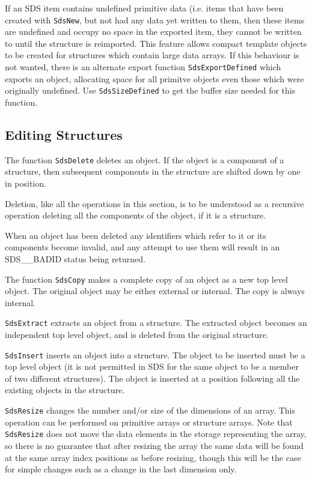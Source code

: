 If an SDS item contains undefined primitive data (i.e. items that have been
created with \verb$SdsNew$, but not had any data yet written to them, then
these items are undefined and occupy no space in the exported item, they
cannot be written to until the structure is reimported. This feature allows
compact template objects to be created for structures which contain large data
arrays. If this behaviour is not wanted, there is an alternate export function
\verb$SdsExportDefined$ which exports an object, allocating space for all
primitve objects even those which were originally undefined. Use
\verb$SdsSizeDefined$ to get the buffer size needed for this function.

\subsection{Editing Structures}

The function \verb$SdsDelete$ deletes an object. If the object is a component
of a structure, then subsequent components in the structure are shifted down by
one in position.

Deletion, like all the operations in this section, is to be understood as a
recursive operation deleting all the components of the object, if it is a
structure.

When an object has been deleted any identifiers which refer to it or its
components become invalid, and any attempt to use them will result in an
SDS\_\_BADID status being returned.

The function \verb$SdsCopy$ makes a complete copy of an object as a new top
level object. The original object may be either external or internal. The copy
is always internal.

\verb$SdsExtract$ extracts an object from a structure. The extracted object
becomes an independent top level object, and is deleted from the original
structure.

\verb$SdsInsert$ inserts an object into a structure. The object to be inserted
must be a top level object (it is not permitted in SDS for the same object to
be a member of two different structures). The object is inserted at a position
following all the existing objects in the structure.

\verb$SdsResize$ changes the number and/or size of the dimensions of an array. 
This operation can be performed on primitive arrays or structure arrays. Note
that \verb$SdsResize$ does not move the data elements in the storage
representing the array, so there is no guarantee that after resizing the array
the same data will be found at the same array index positions as before
resizing, though this will be the case for simple changes such as a change in
the last dimension only.

